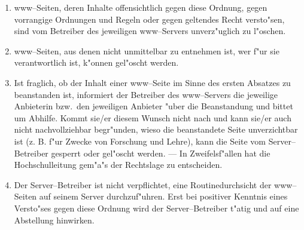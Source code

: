 \begin{enumerate}
  \item www--Seiten, deren Inhalte offensichtlich gegen diese Ordnung,
        gegen vorrangige Ordnungen und Regeln oder gegen geltendes
        Recht versto"sen, sind vom Betreiber des jeweiligen
        www--Servers unverz"uglich zu l"oschen.

  \item www--Seiten, aus denen nicht unmittelbar zu entnehmen ist,
        wer f"ur sie verantwortlich ist, k"onnen gel"oscht
        werden.

  \item Ist fraglich, ob der Inhalt einer www--Seite im Sinne des
        ersten Absatzes zu beanstanden ist, informiert der Betreiber
        des www--Servers die jeweilige Anbieterin bzw.\  den jeweiligen
        Anbieter "uber die Beanstandung und bittet um Abhilfe.
        Kommt sie/er diesem Wunsch nicht nach und kann sie/er auch
        nicht nachvollziehbar begr"unden, wieso die beanstandete
        Seite unverzichtbar ist (z. B. f"ur Zwecke von Forschung
        und Lehre), kann die Seite vom Server--Betreiber gesperrt oder
        gel"oscht werden. --- In Zweifelsf"allen hat die
        Hochschulleitung gem"a"s der Rechtslage zu
        entscheiden.

  \item Der Server--Betreiber ist nicht verpflichtet, eine
        Routinedurchsicht der www--Seiten auf seinem Server
        durchzuf"uhren. Erst bei positiver Kenntnis eines
        Versto"ses gegen diese Ordnung wird der
        Server--Betreiber t"atig und auf eine Abstellung
        hinwirken.
\end{enumerate}
